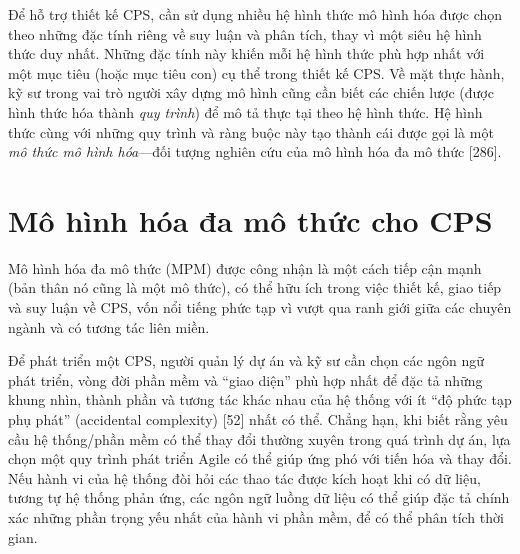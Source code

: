 Để hỗ trợ thiết kế CPS, cần sử dụng nhiều hệ hình thức mô hình hóa được chọn theo những đặc tính riêng về suy luận và phân tích, thay vì một siêu hệ hình thức duy nhất. Những đặc tính này khiến mỗi hệ hình thức phù hợp nhất với một mục tiêu (hoặc mục tiêu con) cụ thể trong thiết kế CPS. Về mặt thực hành, kỹ sư trong vai trò người xây dựng mô hình cũng cần biết các chiến lược (được hình thức hóa thành \emph{quy trình}) để mô tả thực tại theo hệ hình thức. Hệ hình thức cùng với những quy trình và ràng buộc này tạo thành cái được gọi là một \emph{mô thức mô hình hóa}---đối tượng nghiên cứu của mô hình hóa đa mô thức [286].

\section{Mô hình hóa đa mô thức cho CPS}
Mô hình hóa đa mô thức (MPM) được công nhận là một cách tiếp cận mạnh (bản thân nó cũng là một mô thức), có thể hữu ích trong việc thiết kế, giao tiếp và suy luận về CPS, vốn nổi tiếng phức tạp vì vượt qua ranh giới giữa các chuyên ngành và có tương tác liên miền.

Để phát triển một CPS, người quản lý dự án và kỹ sư cần chọn các ngôn ngữ phát triển, vòng đời phần mềm và ``giao diện'' phù hợp nhất để đặc tả những khung nhìn, thành phần và tương tác khác nhau của hệ thống với ít ``độ phức tạp phụ phát'' (accidental complexity) [52] nhất có thể. Chẳng hạn, khi biết rằng yêu cầu hệ thống/phần mềm có thể thay đổi thường xuyên trong quá trình dự án, lựa chọn một quy trình phát triển Agile có thể giúp ứng phó với tiến hóa và thay đổi. Nếu hành vi của hệ thống đòi hỏi các thao tác được kích hoạt khi có dữ liệu, tương tự hệ thống phản ứng, các ngôn ngữ luồng dữ liệu có thể giúp đặc tả chính xác những phần trọng yếu nhất của hành vi phần mềm, để có thể phân tích thời gian.

